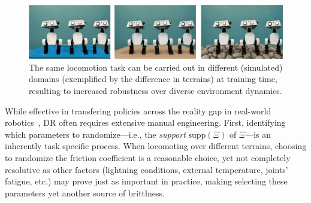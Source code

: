 \begin{figure}
    \centering
    \includegraphics[width=0.9\linewidth]{figures/ch3/ch3-many-ducks.pdf}
    \caption{The same locomotion task can be carried out in different (simulated) domains (exemplified by the difference in terrains) at training time, resulting to increased robustness over diverse environment dynamics.}
    \label{fig:ducks-on-terrains}
\end{figure}

While effective in transfering policies across the reality gap in real-world robotics~\citep{tobinDomainRandomizationTransferring2017,akkayaSolvingRubiksCube2019, jiDribbleBotDynamicLegged2023,tiboniDomainRandomizationEntropy2024}, DR often requires extensive manual engineering.
First, identifying which parameters to randomize---i.e., the \emph{support} \( \text{supp} (\Xi) \) of \( \Xi \)---is an inherently task specific process.
When locomoting over different terrains, choosing to randomize the friction coefficient is a reasonable choice, yet not completely resolutive as other factors (lightning conditions, external temperature, joints' fatigue, etc.) may prove just as important in practice, making selecting these parameters yet another source of brittlness.

